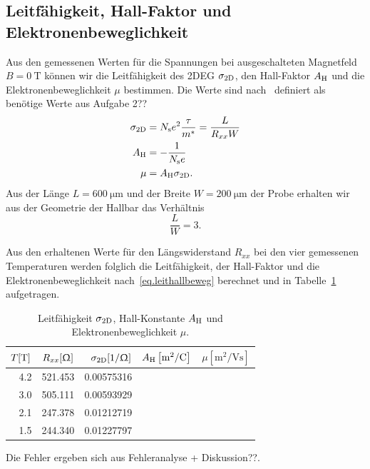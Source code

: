 \documentclass[paper=a4,fontsize=10pt,DIV=18,twocolumn,parskip=half]{scrartcl}
\numberwithin{equation}{section}    %
\newcommand{\note}[1]{{\color{red}#1??}}
\begin{document}
\subsection{Leitfähigkeit, Hall-Faktor und Elektronenbeweglichkeit}
\label{a3}

Aus den gemessenen Werten für die Spannungen bei ausgeschalteten Magnetfeld $B=\SI{0}{\tesla}$ können wir die Leitfähigkeit des 2DEG $\sigma_{\rm 2D}$, den Hall-Faktor $A_{\rm H}$ und die Elektronenbeweglichkeit $\mu$ bestimmen. Die Werte sind nach~\citet{anleitung} definiert als \note{benötige Werte aus Aufgabe 2}
\begin{align}
	\sigma_{\rm 2D} &= N_{\rm s} e^2 \frac{\tau}{m^*} = \frac{L}{R_{xx} W}\\
	A_{\rm H} 		&= -\frac{1}{N_{\rm s}e}\\
	\mu 			&= A_{\rm H} \sigma_{\rm 2D}.
	\label{eq.leithallbeweg}
\end{align}
Aus der Länge $L=\SI{600}{\micro\meter}$ und der Breite $W=\SI{200}{\micro\meter}$ der Probe erhalten wir aus der Geometrie der Hallbar das Verhältnis
\begin{equation}
	\frac{L}{W} = 3.
\end{equation}

Aus den erhaltenen Werte für den Längswiderstand $R_{xx}$ bei den vier gemessenen Temperaturen werden folglich die Leitfähigkeit, der Hall-Faktor und die Elektronenbeweglichkeit nach~\eqref{eq.leithallbeweg} berechnet und in Tabelle~\ref{tab.leithallbeweg} aufgetragen.

\begin{table}[htp]
	\begin{center}
		\begin{tabular}{rrrrr}
			\hline
			$T[\rm T]$ & $R_{xx}[\Upomega]$ & $\sigma_{\rm 2D}[1/\Upomega]$ & $A_{\rm H}\left[ \mathrm{m}^2/\mathrm{C} \right]$ & $\mu \left[ \mathrm{m}^2/\mathrm{Vs} \right]$\\
			\hline
			4.2 & 521.453 & 0.00575316 &&\\
			3.0 & 505.111 & 0.00593929 &&\\
			2.1 & 247.378 & 0.01212719 &&\\
			1.5 & 244.340 & 0.01227797 &&\\
			\hline
		\end{tabular}
		\caption{Leitfähigkeit $\sigma_{\rm 2D}$, Hall-Konstante $A_{\rm H}$ und Elektronenbeweglichkeit $\mu$.}
		\label{tab.leithallbeweg}
	\end{center}
\end{table}
Die Fehler ergeben sich aus \note{Fehleranalyse + Diskussion}.
\end{document}
